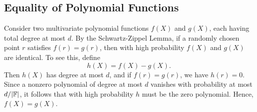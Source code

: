 \subsection{Equality of Polynomial Functions}
Consider two multivariate polynomial functions $f(X)$ and $g(X)$, each having total degree at most $d$. 
By the Schwartz-Zippel Lemma, if a randomly chosen point $r$ satisfies $f(r) = g(r)$, then with high probability $f(X)$ and $g(X)$ are identical. To see this, define
\[
    h(X) = f(X) - g(X).
\]
Then $h(X)$ has degree at most $d$, and if $f(r) = g(r)$, we have $h(r)=0$. 
Since a nonzero polynomial of degree at most $d$ vanishes with probability at most $d/|\mathbb{F}|$, it follows that with high probability $h$ must be the zero polynomial. Hence, $f(X) = g(X)$.



\printbibliography[heading=subbibliography]